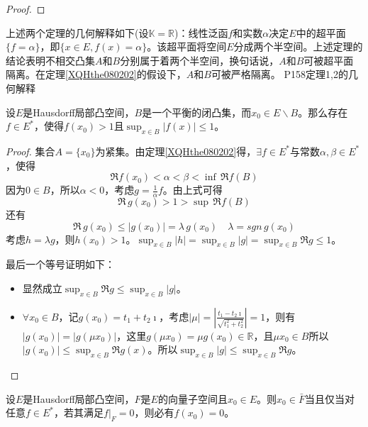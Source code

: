 \begin{proof}
	
\end{proof}

\original
{
	上述两个定理的几何解释如下(设$\mathbb{K}=\mathbb{R}$)：线性泛函$f$和实数$\alpha$决定$E$中的超平面$\{f=\alpha\}$，即$\{x\in E,f(x)=\alpha\}$。该超平面将空间$E$分成两个半空间。上述定理的结论表明不相交凸集$A$和$B$分别属于着两个半空间，换句话说，$A$和$B$可被超平面隔离。在定理\ref{XQHthe080202}的假设下，$A$和$B$可被严格隔离。
}
{P158定理1,2的几何解释}

\begin{corollary}
	设$E$是Hausdorff局部凸空间，$B$是一个平衡的闭凸集，而$x_{0}\in E\backslash B$。那么存在$f\in E^*$，使得$f(x_{0})>1$且$\sup_{x\in B}|f(x)|\leq 1$。
\end{corollary}

\begin{proof}
	集合$A=\{x_{0}\}$为紧集。由定理\ref{XQHthe080202}得，$\exists f\in E^{*}$与常数$\alpha ,\beta\in E^{*}$，使得
	\begin{equation*}
	 \Re f(x_{0})<\alpha<\beta<\inf\,\Re f(B)
	\end{equation*}
	因为$0\in B$，所以$\alpha <0$，考虑$g=\frac{1}{\alpha}f$。由上式可得
	\begin{equation*}
		\Re\, g(x_{0})>1>\sup \, \Re f(B)
	\end{equation*}
	还有
	\begin{equation*}
		\Re\,g(x_{0})\leq |g(x_{0})|=\lambda\,g(x_{0})\quad \lambda=sgn \, g(x_{0})
	\end{equation*}
	考虑$h=\lambda g$，则$h(x_{0})>1$。$\sup_{x\in B}|h|=\sup_{x\in B}|g|=\sup_{x\in B}\Re g\leq 1$。
	\par
	最后一个等号证明如下：
	\begin{itemize}
		\item 显然成立$\sup_{x\in B}\Re g\leq \sup_{x\in B}|g|$。
		\item $\forall x_{0}\in B$，记$g(x_{0})=t_{1}+t_{2} \imath $，考虑$|\mu|=\left|\frac{t_{1}-t_{2}\imath}{\sqrt{t_{1}^{2}+t_{2}^{2}}}\right|=1$，则有$|g(x_{0})|=|g(\mu x_{0})|$，这里$g(\mu x_{0})=\mu g(x_{0})\in \mathbb{R}$，且$\mu x_{0}\in B$所以$|g(x_{0})|\leq \sup_{x\in B} \Re g(x)$。所以$\sup_{x\in B}|g|\leq \sup_{x\in B}\Re g$。
	\end{itemize}
\end{proof}

\begin{corollary}
	设$E$是Hausdorff局部凸空间，$F$是$E$的向量子空间且$x_{0}\in E$。则$x_{0}\in \bar{F}$当且仅当对任意$f\in E^{*}$，若其满足$f\big|_{F}=0$，则必有$f(x_{0})=0$。
\end{corollary}

